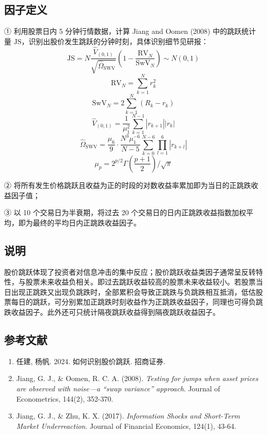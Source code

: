 \documentclass{article}
\begin{document}
\subsection{因子定义}

① 利用股票日内 5 分钟行情数据，计算 Jiang and Oomen (2008) 中的跳跃统计量 \( \mathrm{JS} \)，识别出股价发生跳跃的分钟时刻，具体识别细节见研报：
\begin{equation}
    \mathrm{JS} = N \frac{\hat{V}_{(0,1)}}{\sqrt{\hat{\Omega}_{\mathrm{SWV}}}} \left( 1 - \frac{\mathrm{RV}_N}{\mathrm{SwV}_N} \right) \sim N(0,1)
\end{equation}
\begin{equation}
    \mathrm{RV}_N = \sum_{k=1}^{N} r_k^2
\end{equation}
\begin{equation}
    \mathrm{SwV}_N = 2 \sum_{k=1}^{N} (R_k - r_k)
\end{equation}
\begin{equation}
    \hat{V}_{(0,1)} = \frac{1}{\mu_1^2} \sum_{k=1}^{N-1} |r_{k+1}| |r_k|
\end{equation}
\begin{equation}
    \hat{\Omega}_{\mathrm{SWV}} = \frac{\mu_6}{9} \cdot \frac{N^3 \mu_1^{-6}}{N - 5} \sum_{k=0}^{N-6} \prod_{l=1}^{6} |r_{k+l}|
\end{equation}
\begin{equation}
    \mu_p = 2^{p/2} \Gamma \left( \frac{p+1}{2} \right) / \sqrt{\pi}
\end{equation}

② 将所有发生价格跳跃且收益为正的时段的对数收益率累加即为当日的正跳跌收益因子值；

③ 以 10 个交易日为半衰期，将过去 20 个交易日的日内正跳跌收益指数加权平均，即为最终的平均日内正跳跌收益因子。

\subsection{说明}
股价跳跃体现了投资者对信息冲击的集中反应；股价跳跃收益类因子通常呈反转特性，与股票未来收益负相关。即过去跳跃收益较高的股票未来收益较小。若股票当日出现正跳跌又出现负跳跌时，全部累积会导致正跳跌与负跳跌相互抵消，低估股票每日的跳跃，可分别累加正跳跌时刻收益作为正跳跌收益因子，同理也可得负跳跌收益因子。此外还可只统计隔夜跳跃收益得到隔夜跳跃收益因子。

\subsection{参考文献}
\begin{enumerate}
    \item 任建, 杨帆. 2024. 如何识别股价跳跃. 招商证券.
    \item Jiang, G. J., \& Oomen, R. C. A. (2008). \textit{Testing for jumps when asset prices are observed with noise—a “swap variance” approach}. Journal of Econometrics, 144(2), 352-370.
    \item Jiang, G. J., \& Zhu, K. X. (2017). \textit{Information Shocks and Short-Term Market Underreaction}. Journal of Financial Economics, 124(1), 43-64.
\end{enumerate}
\end{document}
